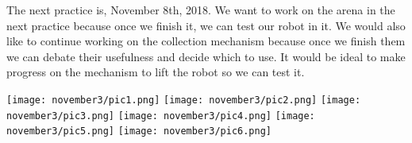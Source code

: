 \documentclass[12pt]{article}
\begin{document}
The next practice is, November 8th, 2018. %
We want to work on the arena in the next practice because once we finish it, we can test our robot in it. We would also like to continue working on the collection mechanism because once we finish them we can debate their usefulness and decide which to use. It would be ideal to make progress on the mechanism to lift the robot so we can test it.

\texttt{[image: november3/pic1.png]}
\texttt{[image: november3/pic2.png]}
\texttt{[image: november3/pic3.png]}
\texttt{[image: november3/pic4.png]}
\texttt{[image: november3/pic5.png]}
\texttt{[image: november3/pic6.png]}
\end{document}
